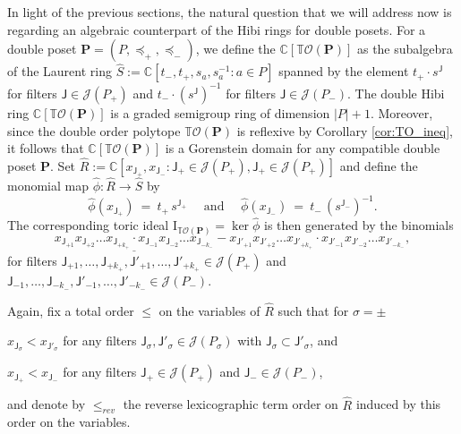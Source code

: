 \documentclass[11pt]{amsart}
\theoremstyle{definition}
\begin{document}
In light of the previous sections, the natural question that we will address
now is regarding an algebraic counterpart of the Hibi rings for double posets.
For a double poset ${\mathbf{P}} = ({P},\preceq_+,\preceq_-)$, we define the
{\textbf{\color{black}{double Hibi ring}}} ${{\mathbb{C}}[{{\mathbb{T}}{\mathcal{O}({{{\mathbf{P}}}})}}]}$ as the subalgebra of the Laurent ring
$\hat{S} := {\mathbb{C}}[t_-,t_+,s_a,s_a^{-1} : a \in {P}]$ spanned by the element $t_+
\cdot s^{\mathsf{J}}$ for filters ${\mathsf{J}} \in {{\mathcal{J}}({{P}_+})}$ and  $t_- \cdot
(s^{\mathsf{J}})^{-1}$ for filters ${\mathsf{J}} \in {{\mathcal{J}}({{P}_-})}$. The double Hibi ring ${{\mathbb{C}}[{{\mathbb{T}}{\mathcal{O}({{{\mathbf{P}}}})}}]}$ is a graded
semigroup ring of dimension $|{P}|+1$. Moreover, since the double order polytope ${{\mathbb{T}}{\mathcal{O}({\mathbf{P}})}}$ is reflexive by Corollary \ref{cor:TO_ineq}, it follows that ${{\mathbb{C}}[{{\mathbb{T}}{\mathcal{O}({{{\mathbf{P}}}})}}]}$ is a Gorenstein domain for any compatible double poset ${\mathbf{P}}$.
Set $\hat{R} := {\mathbb{C}}[ x_{{\mathsf{J}}_+},
x_{{\mathsf{J}}_-} : {\mathsf{J}}_+ \in {{\mathcal{J}}({{P}_+})}, {\mathsf{J}}_+ \in {{\mathcal{J}}({{P}_+})}]$ and
define the monomial map $\hat \phi : \hat R \rightarrow \hat S$ by
\[
    \hat \phi(x_{{\mathsf{J}}_+}) \ = \  t_+\, s^{{\mathsf{J}}_+}
    \quad \text{ and } \quad
    \hat \phi(x_{{\mathsf{J}}_-}) \ = \  t_-\, (s^{{\mathsf{J}}_-})^{-1}.
\]
The corresponding toric ideal ${\mathrm{I}}_{{{\mathbb{T}}{\mathcal{O}({\mathbf{P}})}}} = \ker \hat \phi$ is then
generated by the binomials
\begin{equation}\label{eqn:binom}
    \underline{
    x_{{\mathsf{J}}_{+1}} x_{{\mathsf{J}}_{+2}} \dots x_{{\mathsf{J}}_{+k_+}} \cdot
    x_{{\mathsf{J}}_{-1}} x_{{\mathsf{J}}_{-2}} \dots x_{{\mathsf{J}}_{-k_-}}}
    -
    x_{{\mathsf{J}}'_{+1}} x_{{\mathsf{J}}'_{+2}} \dots x_{{\mathsf{J}}'_{+k_+}} \cdot
    x_{{\mathsf{J}}'_{-1}} x_{{\mathsf{J}}'_{-2}} \dots x_{{\mathsf{J}}'_{-k_-}},
\end{equation}
for filters ${\mathsf{J}}_{+1}, \dots, {\mathsf{J}}_{+k_+}, {\mathsf{J}}'_{+1}, \dots,
{\mathsf{J}}'_{+k_+} \in {{\mathcal{J}}({{P}_+})}$ and ${\mathsf{J}}_{-1}, \dots, {\mathsf{J}}_{-k_-},
{\mathsf{J}}'_{-1}, \dots, {\mathsf{J}}'_{-k_-} \in {{\mathcal{J}}({{P}_-})}$.

Again, fix a total order $\le$ on the variables of $\hat{R}$ such that for
$\sigma = \pm$
\begin{compactitem}
    \item $x_{{\mathsf{J}}_\sigma} < x_{{\mathsf{J}}'_\sigma}$ for any filters
        ${\mathsf{J}}_\sigma,{\mathsf{J}}'_\sigma \in {{\mathcal{J}}({{P}_\sigma})}$ with
        ${\mathsf{J}}_\sigma \subset {\mathsf{J}}'_\sigma$, and
    \item $x_{{\mathsf{J}}_+} < x_{{\mathsf{J}}_-}$ for any filters 
        ${\mathsf{J}}_+ \in {{\mathcal{J}}({{P}_+})}$ and 
        ${\mathsf{J}}_- \in {{\mathcal{J}}({{P}_-})}$,
\end{compactitem}
and denote by ${\le_{rev}}$ the reverse lexicographic term order on $\hat R$ induced
by this order on the variables.
\end{document}
